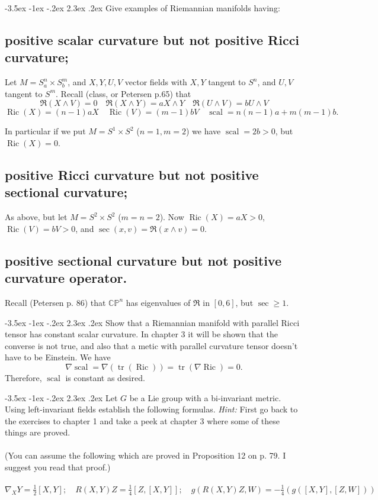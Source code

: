 \documentclass[10pt]{article}
\makeatletter
\renewcommand\section{\@startsection{section}{1}{\z@}%
                                  {-3.5ex \@plus -1ex \@minus -.2ex}%
                                  {2.3ex \@plus.2ex}%
                                  {\normalfont\large\bfseries}}
\DeclareMathOperator{\ric}{Ric}
\DeclareMathOperator{\scal}{scal}
\DeclareMathOperator{\tr}{tr}
\newcommand{\hint}[1]{{\emph{Hint:} #1}} %
\makeatother
\begin{document}

\section{Give examples of Riemannian manifolds having:}
\subsection{positive scalar curvature but not positive Ricci curvature;}

Let $M = S^n_a \times S_b^m$, and $X,Y, U,V$ vector fields with $X,Y$ tangent to $S^n$, and $U,V$ tangent to $S^m$. 
Recall (class, or Petersen p.65) that
\[\mathfrak{R} (X \wedge V) = 0 \quad \mathfrak{R} (X \wedge Y) = a X \wedge Y \quad \mathfrak{R} (U \wedge V) = b U \wedge V \]
\[\ric (X) = (n-1) a X \quad \ric(V) = (m-1) bV \quad \scal = n(n-1) a + m(m-1) b.\]

In particular if we put $M = S^1 \times S^2$ ($n=1 , m=2$) we have $\scal = 2b > 0$, but $\ric(X) = 0$.

\subsection{positive Ricci curvature but not positive sectional curvature;}

As above, but let $M = S^2 \times S^2$ ($m=n=2$). Now $\ric(X) = a X > 0$, $\ric(V) = b V > 0 $, and $\sec(x,v) = \mathfrak{R}(x \wedge v) = 0$.

\subsection{positive sectional curvature but not positive curvature operator.}
Recall (Petersen p. 86)  that $\mathbb{CP}^n$ has eigenvalues of $\mathfrak{R}$ in $[0,6]$, but $\sec \geq 1$.

\section{Show that a Riemannian manifold with parallel Ricci tensor has constant scalar curvature.
In chapter 3 it will be shown that the converse is not true, and also that a metic with parallel curvature tensor doesn't have to be Einstein.}
We have 
\[\nabla \scal = \nabla (\tr (\ric))  = \tr ( \nabla \ric ) = 0.\]
Therefore, $\scal$ is constant as desired.

\section{Let $G$ be a Lie group with a bi-invariant metric. Using 
left-invariant fields establish the following formulas. \hint{First go back to the exercises to chapter 1 and take a peek at chapter 3 where some of these things   are proved.} \\ \\ (You can assume the following which are proved in Proposition 12 on p. 79. I suggest you read that proof.) \\ \\ $\nabla_X Y = \frac{1}{2} [X,Y]; \quad R(X,Y)Z = \frac{1}{4}[Z,[X,Y]]; \quad g(R(X,Y)Z,W) = - \frac{1}{4} (g([X,Y],[Z,W]))$}
\end{document}

